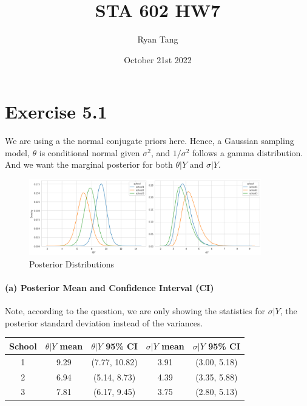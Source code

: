 \documentclass[11pt, letterpaper]{article}
\author{Ryan Tang}
\title{STA 602 HW7}
\date{October 21st 2022}
\begin{document}
\maketitle

\section{Exercise 5.1}
We are using a the normal conjugate priors here. Hence, a Gaussian sampling model, $\theta$ is conditional normal given $\sigma^2$, and $1/\sigma^2$ follows a gamma distribution. And we want the marginal posterior for both $\theta|Y$ and $\sigma|Y$.
\begin{figure}[!h]
  \centering
  \includegraphics[width=0.9\textwidth]{5.1.a.png}
  \captionsetup{justification=centering}
  \caption{Posterior Distributions}
\end{figure}

\paragraph{(a) Posterior Mean and Confidence Interval (CI)}
Note, according to the question, we are only showing the statistics for $\sigma|Y$, the posterior standard deviation instead of the variances.
\begin{center}
\begin{tabular}{||c c c c c||} 
 \hline
 School & $\theta|Y$ mean & $\theta|Y$ 95\% CI & $\sigma|Y$ mean & $\sigma|Y$ 95\% CI \\ [0.5ex] 
 \hline\hline
 1 & 9.29 & (7.77, 10.82) & 3.91 & (3.00, 5.18) \\ 
 \hline
 2 & 6.94 & (5.14, 8.73) & 4.39 &(3.35, 5.88) \\
 \hline
 3 & 7.81 & (6.17, 9.45) & 3.75 & (2.80, 5.13) \\
 \hline
\end{tabular}
\end{center}
\end{document}
